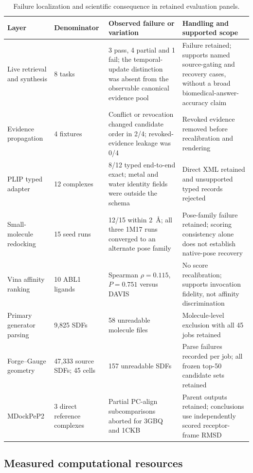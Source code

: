 \documentclass{article}
\begin{document}
\begin{table}[htbp]
\centering
\scriptsize
\caption{Failure localization and scientific consequence in retained evaluation panels.}
\label{tab:sup-failure-localization}
\begin{tabular}{p{2.1cm}p{2.1cm}p{3.6cm}p{3.6cm}}
\toprule
Layer & Denominator & Observed failure or variation & Handling and supported scope \\
\midrule
Live retrieval and synthesis & 8 tasks & 3 pass, 4 partial and 1 fail; the temporal-update distinction was absent from the observable canonical evidence pool & Failure retained; supports named source-gating and recovery cases, without a broad biomedical-answer-accuracy claim \\
Evidence propagation & 4 fixtures & Conflict or revocation changed candidate order in 2/4; revoked-evidence leakage was 0/4 & Revoked evidence removed before recalibration and rendering \\
PLIP typed adapter & 12 complexes & 8/12 typed end-to-end exact; metal and water identity fields were outside the schema & Direct XML retained and unsupported typed records rejected \\
Small-molecule redocking & 15 seed runs & 12/15 within 2~\AA; all three 1M17 runs converged to an alternate pose family & Pose-family failure retained; scoring consistency alone does not establish native-pose recovery \\
Vina affinity ranking & 10 ABL1 ligands & Spearman $\rho=0.115$, $P=0.751$ versus DAVIS & No score recalibration; supports invocation fidelity, not affinity discrimination \\
Primary generator parsing & 9,825 SDFs & 58 unreadable molecule files & Molecule-level exclusion with all 45 jobs retained \\
Forge--Gauge geometry & 47,333 source SDFs; 45 cells & 157 unreadable SDFs & Parse failures recorded per job; all frozen top-50 candidate sets retained \\
MDockPeP2 & 3 direct reference complexes & Partial PC-align subcomparisons aborted for 3GBQ and 1CKB & Parent outputs retained; conclusions use independently scored receptor-frame RMSD \\
\bottomrule
\end{tabular}
\end{table}

\subsection{Measured computational resources}
\end{document}
